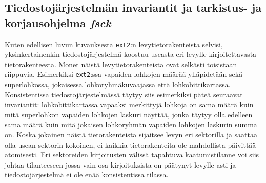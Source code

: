\subsection{Tiedostojärjestelmän invariantit ja tarkistus- ja korjausohjelma \emph{fsck}}

Kuten edellisen luvun kuvauksesta \texttt{ext2}:n levytietorakenteista selvisi,
yksinkertainenkin tiedostojärjestelmä koostuu useasta eri levylle kirjoitettavasta tietorakenteesta.
Monet näistä levytietorakenteista ovat selkästi toisistaan riippuvia.
Esimerkiksi \texttt{ext2}:ssa vapaiden lohkojen määrää ylläpidetään sekä superlohkossa, jokaisessa lohkoryhmäkuvaajassa että lohkobittikartassa.
Konsistentissa tiedostojärjestelmässä täytyy siis esimerkiksi päteä seuraavat invariantit: lohkobittikartassa vapaaksi merkittyjä lohkoja on sama määrä kuin mitä superlohkon vapaiden lohkojen laskuri näyttää,
jonka täytyy olla edelleen sama määrä kuin mitä jokaisen lohkoryhmän vapaiden lohkojen laskurin summa on.
Koska jokainen näistä tietorakenteista sijaitsee levyn eri sektorilla ja saattaa olla usean sektorin kokoinen,
ei kaikkia tietorakenteita ole mahdollista päivittää atomisesti.
Eri sektoreiden kirjoitusten välissä tapahtuva kaatumistilanne voi siis johtaa tilanteeseen jossa vain osa kirjoituksista on päätynyt levylle asti
ja tiedostojärjestelmä ei ole enää konsistentissa tilassa.


